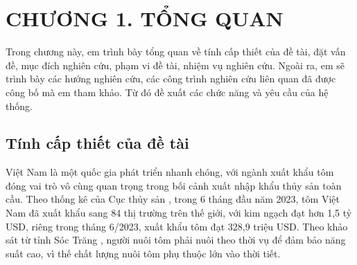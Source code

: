 \documentclass{article} %
\begin{document}
	
	
	
	\tableofcontents
	\thispagestyle{empty}
	\cleardoublepage
	
	
	
	
	
	{\let\oldnumberline\numberline
		\renewcommand{\numberline}{Hình~\oldnumberline}
		\listoffigures} 
	\newpage
	
	{\let\oldnumberline\numberline
		\renewcommand{\numberline}{Bảng~\oldnumberline}
		\listoftables}
	\newpage
	
	\cleardoublepage
	
	
	\section*{CHƯƠNG 1. TỔNG QUAN}
	\setcounter{section}{1}
	\setcounter{figure}{0}
	\setcounter{table}{0}
	Trong chương này, em trình bày tổng quan về tính cấp thiết của đề tài, đặt vấn đề, mục đích nghiên cứu, phạm vi đề tài, nhiệm vụ nghiên cứu. Ngoài ra, em sẽ trình bày các hướng nghiên cứu, các công trình nghiên cứu liên quan đã được công bố mà em tham khảo. Từ đó đề xuất các chức năng và yêu cầu của hệ thống.
	
	\subsection{Tính cấp thiết của đề tài}
	Việt Nam là một quốc gia phát triển nhanh chóng, với ngành xuất khẩu tôm đóng vai trò vô cùng quan trọng trong bối cảnh xuất nhập khẩu thủy sản toàn cầu. Theo thống kê của Cục thủy sản \cite{Thuysan}, trong 6 tháng đầu năm 2023, tôm Việt Nam đã xuất khẩu sang 84 thị trường trên thế giới, với kim ngạch đạt hơn 1,5 tỷ USD, riêng trong tháng 6/2023, xuất khẩu tôm đạt 328,9 triệu USD. Theo khảo sát từ tỉnh Sóc Trăng \cite{SocTrang}, người nuôi tôm phải nuôi theo thời vụ để đảm bảo năng suất cao, vì thế chất lượng nuôi tôm phụ thuộc lớn vào thời tiết. 
	
\end{document}
